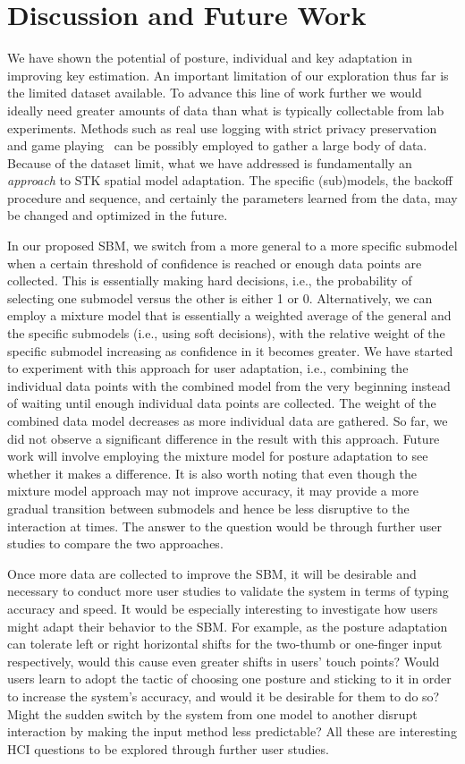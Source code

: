 \documentclass{sigchi}
\begin{document}
\section{Discussion and Future Work}
We have shown the potential of posture, individual and key adaptation in 
improving key estimation. An important limitation of our exploration thus far is
the limited dataset available. To advance this line of work further we would ideally need greater 
amounts of data than what is typically collectable from lab experiments. Methods
such as real use logging with strict privacy preservation and game 
playing~\cite{Rudchenko:2011} can be possibly employed to gather a large body of
data. Because of the dataset limit, what we have addressed is fundamentally an 
\textit{approach} to STK spatial model adaptation. The specific (sub)models, the
backoff procedure and sequence, and certainly the parameters learned from the 
data, may be changed and optimized in the future.

In our proposed SBM, we switch from a more general to a more specific submodel
when a certain threshold of confidence is reached or enough data points are
collected. This is essentially making hard decisions, i.e., the probability of
selecting one submodel versus the other is either 1 or 0. Alternatively,
we can employ a mixture model that is essentially a weighted average of
the general and the specific submodels (i.e., using soft decisions), with the
relative weight of the specific submodel increasing as confidence in it becomes
greater. We have started to experiment with this approach for user adaptation,
i.e., combining the individual data points with the combined model from the very beginning instead
of waiting until enough individual data points are collected. The weight of the
combined data model decreases as more individual data are gathered. So far, we
did not observe a significant difference in the result with this approach.
Future work will involve employing the mixture model for posture adaptation to see whether it makes a difference.
It is also worth noting that even though the mixture model approach may not
improve accuracy, it may provide a more gradual transition between submodels
and hence be less disruptive to the interaction at times. The answer to the
question would be through further user studies to compare the two approaches. 

Once more data are collected to improve the SBM, it will be desirable and
necessary to conduct more user studies to validate the system in terms of typing
accuracy and speed. It would be especially interesting to investigate how users
might adapt their behavior to the SBM. For example, as the posture adaptation
can tolerate left or right horizontal shifts for the two-thumb or one-finger
input respectively, would this cause even
greater shifts in users' touch points? Would users learn to adopt the
tactic of choosing one posture and sticking to it in order to increase the system's
accuracy, and would it be desirable for them to do so? Might the sudden switch
by the system from one model to another disrupt interaction by making the input 
method less predictable? All these are interesting HCI questions to be explored
through further user studies.
\end{document}
